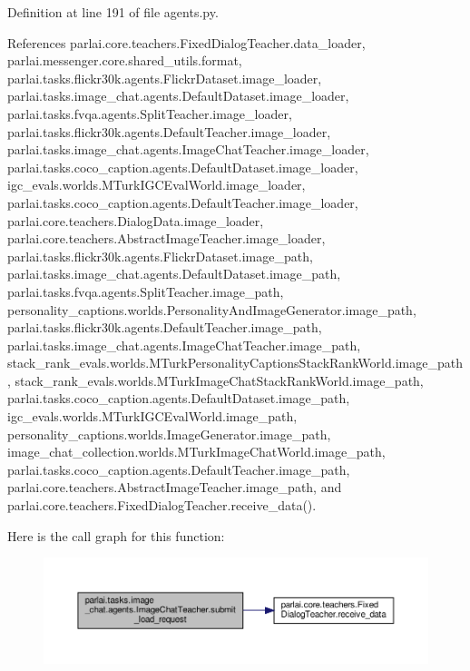 Definition at line 191 of file agents.\+py.



References parlai.\+core.\+teachers.\+Fixed\+Dialog\+Teacher.\+data\+\_\+loader, parlai.\+messenger.\+core.\+shared\+\_\+utils.\+format, parlai.\+tasks.\+flickr30k.\+agents.\+Flickr\+Dataset.\+image\+\_\+loader, parlai.\+tasks.\+image\+\_\+chat.\+agents.\+Default\+Dataset.\+image\+\_\+loader, parlai.\+tasks.\+fvqa.\+agents.\+Split\+Teacher.\+image\+\_\+loader, parlai.\+tasks.\+flickr30k.\+agents.\+Default\+Teacher.\+image\+\_\+loader, parlai.\+tasks.\+image\+\_\+chat.\+agents.\+Image\+Chat\+Teacher.\+image\+\_\+loader, parlai.\+tasks.\+coco\+\_\+caption.\+agents.\+Default\+Dataset.\+image\+\_\+loader, igc\+\_\+evals.\+worlds.\+M\+Turk\+I\+G\+C\+Eval\+World.\+image\+\_\+loader, parlai.\+tasks.\+coco\+\_\+caption.\+agents.\+Default\+Teacher.\+image\+\_\+loader, parlai.\+core.\+teachers.\+Dialog\+Data.\+image\+\_\+loader, parlai.\+core.\+teachers.\+Abstract\+Image\+Teacher.\+image\+\_\+loader, parlai.\+tasks.\+flickr30k.\+agents.\+Flickr\+Dataset.\+image\+\_\+path, parlai.\+tasks.\+image\+\_\+chat.\+agents.\+Default\+Dataset.\+image\+\_\+path, parlai.\+tasks.\+fvqa.\+agents.\+Split\+Teacher.\+image\+\_\+path, personality\+\_\+captions.\+worlds.\+Personality\+And\+Image\+Generator.\+image\+\_\+path, parlai.\+tasks.\+flickr30k.\+agents.\+Default\+Teacher.\+image\+\_\+path, parlai.\+tasks.\+image\+\_\+chat.\+agents.\+Image\+Chat\+Teacher.\+image\+\_\+path, stack\+\_\+rank\+\_\+evals.\+worlds.\+M\+Turk\+Personality\+Captions\+Stack\+Rank\+World.\+image\+\_\+path, stack\+\_\+rank\+\_\+evals.\+worlds.\+M\+Turk\+Image\+Chat\+Stack\+Rank\+World.\+image\+\_\+path, parlai.\+tasks.\+coco\+\_\+caption.\+agents.\+Default\+Dataset.\+image\+\_\+path, igc\+\_\+evals.\+worlds.\+M\+Turk\+I\+G\+C\+Eval\+World.\+image\+\_\+path, personality\+\_\+captions.\+worlds.\+Image\+Generator.\+image\+\_\+path, image\+\_\+chat\+\_\+collection.\+worlds.\+M\+Turk\+Image\+Chat\+World.\+image\+\_\+path, parlai.\+tasks.\+coco\+\_\+caption.\+agents.\+Default\+Teacher.\+image\+\_\+path, parlai.\+core.\+teachers.\+Abstract\+Image\+Teacher.\+image\+\_\+path, and parlai.\+core.\+teachers.\+Fixed\+Dialog\+Teacher.\+receive\+\_\+data().

Here is the call graph for this function\+:
\nopagebreak
\begin{figure}[H]
\begin{center}
\leavevmode
\includegraphics[width=350pt]{classparlai_1_1tasks_1_1image__chat_1_1agents_1_1ImageChatTeacher_a6028198a57fccc50c4c7f4f294ed1f33_cgraph}
\end{center}
\end{figure}


